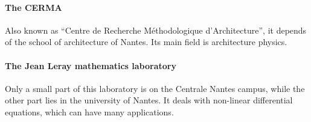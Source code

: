 \paragraph{The CERMA} Also known as “Centre de Recherche Méthodologique d'Architecture”, it depends of the school of architecture of Nantes. Its main field is architecture physics. %
\paragraph{The Jean Leray mathematics laboratory} Only a small part of this laboratory is on the Centrale Nantes campus, while the other part lies in the university of Nantes. It deals with non-linear differential equations, which can have many applications. %

